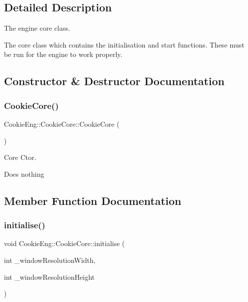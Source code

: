 \subsection{Detailed Description}
The engine core class. 

The core class which contains the initialisation and start functions. These must be run for the engine to work properly. 

\subsection{Constructor \& Destructor Documentation}
\mbox{\label{class_cookie_eng_1_1_cookie_core_a4eca2aeec2dc76b06646bd5124de3d98}} 
\subsubsection{\texorpdfstring{Cookie\+Core()}{CookieCore()}}
{\footnotesize\ttfamily Cookie\+Eng\+::\+Cookie\+Core\+::\+Cookie\+Core (\begin{DoxyParamCaption}{ }\end{DoxyParamCaption})}



Core Ctor. 

Does nothing 

\subsection{Member Function Documentation}
\mbox{\label{class_cookie_eng_1_1_cookie_core_ac3921a88393cf927bce932958ba710b6}} 
\subsubsection{\texorpdfstring{initialise()}{initialise()}}
{\footnotesize\ttfamily void Cookie\+Eng\+::\+Cookie\+Core\+::initialise (\begin{DoxyParamCaption}\item[{int}]{\+\_\+window\+Resolution\+Width,  }\item[{int}]{\+\_\+window\+Resolution\+Height }\end{DoxyParamCaption})}



